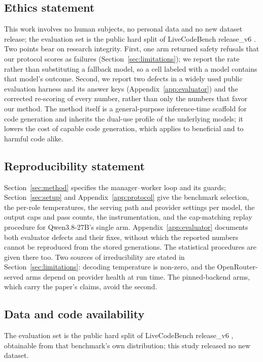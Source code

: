 \documentclass{article}
\begin{document}
\subsection*{Ethics statement}

This work involves no human subjects, no personal data and no new dataset release; the evaluation
set is the public hard split of LiveCodeBench release\_v6 \citep{jain2024}. Two points bear
on research integrity. First, one arm returned safety refusals that our protocol scores as
failures (Section~\ref{sec:limitations}); we report the rate rather than substituting a fallback
model, so a cell labeled with a model contains that model's outcome. Second, we report two defects in
a widely used public evaluation harness and its answer keys (Appendix~\ref{app:evaluator}) and the
corrected re-scoring of every number, rather than only the numbers that favor our method. The method itself
is a general-purpose inference-time scaffold for code generation and inherits the dual-use profile
of the underlying models; it lowers the cost of capable code generation, which applies to
beneficial and to harmful code alike.

\subsection*{Reproducibility statement}

Section~\ref{sec:method} specifies the manager--worker loop and its guards;
Section~\ref{sec:setup} and Appendix~\ref{app:protocol} give
the benchmark selection, the per-role temperatures, the serving path and provider settings per model, the output caps and
pass counts, the instrumentation, and the cap-matching replay procedure for Qwen3.8-27B's single
arm. Appendix~\ref{app:evaluator} documents both evaluator defects and their fixes, without which the
reported numbers cannot be reproduced from the stored generations. The statistical procedures are
given there too. Two sources of irreducibility are stated in
Section~\ref{sec:limitations}: decoding temperature is non-zero, and the OpenRouter-served arms
depend on provider health at run time. The pinned-backend arms, which carry the paper's claims,
avoid the second.

\subsection*{Data and code availability}

The evaluation set is the public hard split of LiveCodeBench release\_v6 \citep{jain2024},
obtainable from that benchmark's own distribution; this study released no new dataset.
\end{document}
